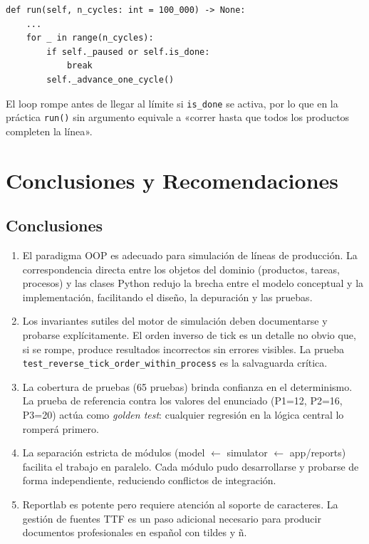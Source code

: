 \documentclass[12pt,letterpaper]{article}
\begin{document}
\begin{lstlisting}
def run(self, n_cycles: int = 100_000) -> None:
    ...
    for _ in range(n_cycles):
        if self._paused or self.is_done:
            break
        self._advance_one_cycle()
\end{lstlisting}

El loop rompe antes de llegar al límite si \texttt{is\_done} se activa, por lo que en la
práctica \texttt{run()} sin argumento equivale a «correr hasta que todos los productos
completen la línea».

\section{Conclusiones y Recomendaciones}

\subsection{Conclusiones}

\begin{enumerate}[leftmargin=2em, itemsep=6pt]
  \item El paradigma OOP es adecuado para simulación de líneas de producción.
    La correspondencia directa entre los objetos del dominio (productos, tareas, procesos)
    y las clases Python redujo la brecha entre el modelo conceptual y la implementación,
    facilitando el diseño, la depuración y las pruebas.

  \item Los invariantes sutiles del motor de simulación deben documentarse y
    probarse explícitamente. El orden inverso de tick es un detalle no obvio que, si se
    rompe, produce resultados incorrectos sin errores visibles. La prueba
    \texttt{test\_reverse\_tick\_order\_within\_process} es la salvaguarda crítica.

  \item La cobertura de pruebas (65 pruebas) brinda confianza en el determinismo.
    La prueba de referencia contra los valores del enunciado (P1=12, P2=16, P3=20) actúa
    como \emph{golden test}: cualquier regresión en la lógica central lo romperá primero.

  \item La separación estricta de módulos (model $\leftarrow$ simulator $\leftarrow$
    app/reports) facilita el trabajo en paralelo. Cada módulo pudo desarrollarse y probarse
    de forma independiente, reduciendo conflictos de integración.

  \item Reportlab es potente pero requiere atención al soporte de caracteres.
    La gestión de fuentes TTF es un paso adicional necesario para producir documentos
    profesionales en español con tildes y ñ.
\end{enumerate}
\end{document}
